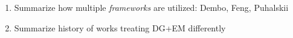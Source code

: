 \begin{enumerate}
  \item
    Summarize how multiple \emph{frameworks} are utilized: Dembo, Feng, Puhalskii
  \item
    Summarize history of works treating DG+EM differently
\end{enumerate}
